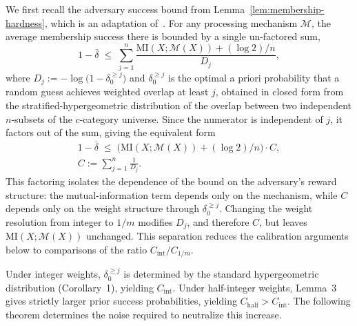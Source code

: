 \documentclass[letterpaper]{article} %
\newcommand{\MI}{\mathrm{MI}}
\begin{document}
We first recall the adversary success bound from Lemma~\ref{lem:membership-hardness}, which is an adaptation of~\cite[Corollary~1]{xiao2024formal}. For any processing mechanism $\mathcal{M}$, the average membership success there is bounded by a single un-factored sum,
\[
1 - \bar{\delta}
\;\le\;
\sum_{j=1}^{n}
\frac{\MI(X;\mathcal{M}(X)) + (\log 2)/n}{D_j},
\]
where $D_j := -\log\!\big(1-\delta_0^{\ge j}\big)$ and $\delta_0^{\ge j}$ is the optimal a priori probability that a random guess achieves weighted overlap at least $j$, obtained in closed form from the stratified-hypergeometric distribution of the overlap between two independent $n$-subsets of the $c$-category universe. Since the numerator is independent of $j$, it factors out of the sum, giving the equivalent form
\begin{equation}
\label{eq:success_bound_recall}
\begin{gathered}
1 - \bar{\delta}
\;\le\;
\big(\MI(X;\mathcal{M}(X)) + (\log 2)/n\big)\cdot C, \\
C := \sum_{j=1}^{n} \frac{1}{D_j}.
\end{gathered}
\end{equation}
This factoring isolates the dependence of the bound on the adversary's reward structure: the mutual-information term depends only on the mechanism, while $C$ depends only on the weight structure through $\delta_0^{\ge j}$. Changing the weight resolution from integer to $1/m$ modifies $D_j$, and therefore $C$, but leaves $\MI(X;\mathcal{M}(X))$ unchanged. This separation reduces the calibration arguments below to comparisons of the ratio $C_{\mathrm{int}}/C_{1/m}$.

Under integer weights, $\delta_0^{\ge j}$ is determined by the standard hypergeometric distribution (Corollary~1), yielding $C_{\mathrm{int}}$. Under half-integer weights, Lemma~3 gives strictly larger prior success probabilities, yielding $C_{\mathrm{half}} > C_{\mathrm{int}}$. The following theorem determines the noise required to neutralize this increase.
\end{document}
